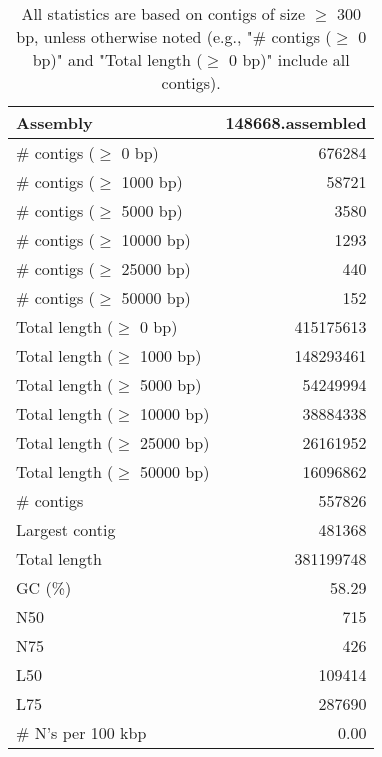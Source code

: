 \documentclass[12pt,a4paper]{article}
\begin{document}
\begin{table}[ht]
\begin{center}
\caption{All statistics are based on contigs of size $\geq$ 300 bp, unless otherwise noted (e.g., "\# contigs ($\geq$ 0 bp)" and "Total length ($\geq$ 0 bp)" include all contigs).}
\begin{tabular}{|l*{1}{|r}|}
\hline
Assembly & 148668.assembled \\ \hline
\# contigs ($\geq$ 0 bp) & 676284 \\ \hline
\# contigs ($\geq$ 1000 bp) & 58721 \\ \hline
\# contigs ($\geq$ 5000 bp) & 3580 \\ \hline
\# contigs ($\geq$ 10000 bp) & 1293 \\ \hline
\# contigs ($\geq$ 25000 bp) & 440 \\ \hline
\# contigs ($\geq$ 50000 bp) & 152 \\ \hline
Total length ($\geq$ 0 bp) & 415175613 \\ \hline
Total length ($\geq$ 1000 bp) & 148293461 \\ \hline
Total length ($\geq$ 5000 bp) & 54249994 \\ \hline
Total length ($\geq$ 10000 bp) & 38884338 \\ \hline
Total length ($\geq$ 25000 bp) & 26161952 \\ \hline
Total length ($\geq$ 50000 bp) & 16096862 \\ \hline
\# contigs & 557826 \\ \hline
Largest contig & 481368 \\ \hline
Total length & 381199748 \\ \hline
GC (\%) & 58.29 \\ \hline
N50 & 715 \\ \hline
N75 & 426 \\ \hline
L50 & 109414 \\ \hline
L75 & 287690 \\ \hline
\# N's per 100 kbp & 0.00 \\ \hline
\end{tabular}
\end{center}
\end{table}
\end{document}
